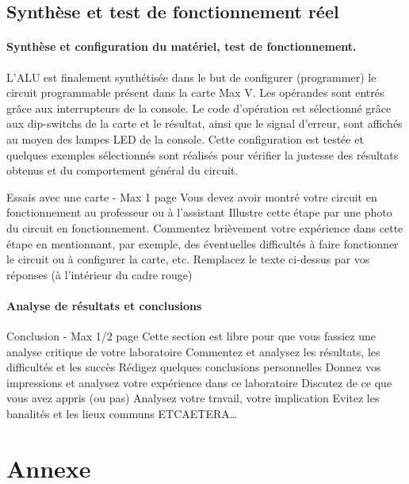 \documentclass[a4paper]{article}
\begin{document}
\subsection{Synthèse et test de fonctionnement réel}
\paragraph{Synthèse et configuration du matériel, test de fonctionnement.}
L’ALU est finalement synthétisée dans le but de configurer (programmer) le circuit programmable présent dans la carte Max V. Les opérandes sont entrés grâce aux interrupteurs de la console. Le code d’opération est sélectionné grâce aux dip-switchs de la carte et le résultat, ainsi que le signal d’erreur, sont affichés au moyen des lampes LED de la console. Cette configuration est testée et quelques exemples sélectionnés sont réalisés pour vérifier la justesse des résultats obtenus et du comportement général du circuit.

\begin{tcolorbox}[colframe=Monokaimagenta,colback=white]
Essais avec une carte - Max 1 page 
Vous devez avoir montré votre circuit en fonctionnement au professeur ou à l’assistant
Illustre cette étape par une photo du circuit en fonctionnement.
Commentez brièvement votre expérience dans cette étape en mentionnant, par exemple, des éventuelles difficultés à faire fonctionner le circuit ou à configurer la carte, etc.
Remplacez le texte ci-dessus par vos réponses (à l’intérieur du cadre rouge)
\end{tcolorbox}

\paragraph{Analyse de résultats et conclusions}
\begin{tcolorbox}[colframe=Monokaimagenta,colback=white]
Conclusion - Max 1/2 page 
Cette section est libre pour que vous fassiez une analyse critique de votre laboratoire
Commentez et analysez 
les résultats, 
les difficultés et les succès
Rédigez quelques conclusions personnelles
Donnez vos impressions et analysez votre expérience dans ce laboratoire
Discutez de ce que vous avez appris (ou pas)
Analysez votre travail, votre implication
Evitez les banalités et les lieux communs
ETCAETERA…
\end{tcolorbox}

\newpage

\section{Annexe}
\end{document}
